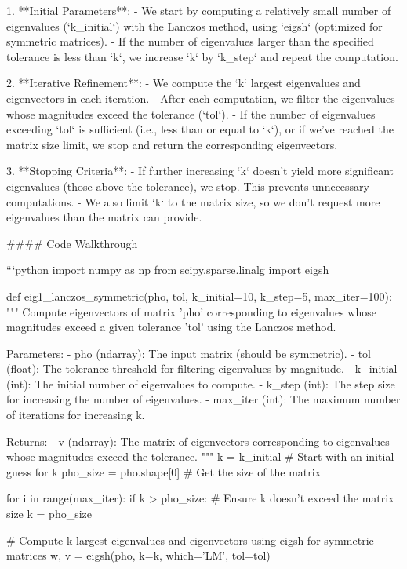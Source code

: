 1. **Initial Parameters**:
   - We start by computing a relatively small number of eigenvalues (`k_initial`) with the Lanczos method, using `eigsh` (optimized for symmetric matrices).
   - If the number of eigenvalues larger than the specified tolerance is less than `k`, we increase `k` by `k_step` and repeat the computation.

2. **Iterative Refinement**:
   - We compute the `k` largest eigenvalues and eigenvectors in each iteration.
   - After each computation, we filter the eigenvalues whose magnitudes exceed the tolerance (`tol`).
   - If the number of eigenvalues exceeding `tol` is sufficient (i.e., less than or equal to `k`), or if we’ve reached the matrix size limit, we stop and return the corresponding eigenvectors.
   
3. **Stopping Criteria**:
   - If further increasing `k` doesn’t yield more significant eigenvalues (those above the tolerance), we stop. This prevents unnecessary computations.
   - We also limit `k` to the matrix size, so we don’t request more eigenvalues than the matrix can provide.

#### Code Walkthrough

```python
import numpy as np
from scipy.sparse.linalg import eigsh

def eig1_lanczos_symmetric(pho, tol, k_initial=10, k_step=5, max_iter=100):
    """
    Compute eigenvectors of matrix 'pho' corresponding to eigenvalues 
    whose magnitudes exceed a given tolerance 'tol' using the Lanczos method.

    Parameters:
    - pho (ndarray): The input matrix (should be symmetric).
    - tol (float): The tolerance threshold for filtering eigenvalues by magnitude.
    - k_initial (int): The initial number of eigenvalues to compute.
    - k_step (int): The step size for increasing the number of eigenvalues.
    - max_iter (int): The maximum number of iterations for increasing k.

    Returns:
    - v (ndarray): The matrix of eigenvectors corresponding to eigenvalues 
                   whose magnitudes exceed the tolerance.
    """
    k = k_initial  # Start with an initial guess for k
    pho_size = pho.shape[0]  # Get the size of the matrix

    for i in range(max_iter):
        if k > pho_size:  # Ensure k doesn't exceed the matrix size
            k = pho_size
        
        # Compute k largest eigenvalues and eigenvectors using eigsh for symmetric matrices
        w, v = eigsh(pho, k=k, which='LM', tol=tol)
        

